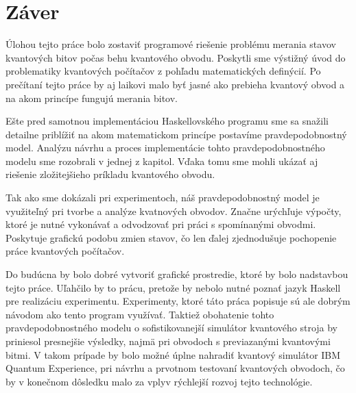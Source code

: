 
\chapter{Záver}
Úlohou tejto práce bolo zostaviť programové riešenie problému merania
stavov kvantových bitov počas behu kvantového obvodu. Poskytli sme výstižný
úvod do problematiky kvantových počítačov z pohľadu matematických 
definýcií. Po prečítaní tejto práce by aj laikovi malo byť jasné ako prebieha
kvantový obvod a na akom princípe fungujú merania bitov.

Ešte pred samotnou implementáciou Haskellovského programu sme sa snažili 
detailne priblížiť na akom matematickom princípe postavíme pravdepodobnostný
model. Analýzu návrhu a proces implementácie tohto pravdepodobnostného modelu
sme rozobrali v jednej z kapitol. Vďaka tomu sme mohli ukázať aj riešenie 
zložitejšieho príkladu kvantového obvodu.

Tak ako sme dokázali pri experimentoch, náš pravdepodobnostný model je 
využiteľný pri tvorbe a analýze kvatnových obvodov. Značne urýchľuje výpočty,
ktoré je nutné vykonávať a odvodzovať pri práci s spomínanými obvodmi.
Poskytuje grafickú podobu zmien stavov, čo len ďalej zjednodušuje pochopenie
práce kvantových počítačov.

Do budúcna by bolo dobré vytvoriť grafické prostredie, ktoré by bolo 
nadstavbou tejto práce. Uľahčilo by to prácu, pretože by nebolo nutné poznať
jazyk Haskell pre realizáciu experimentu. Experimenty, ktoré táto práca 
popisuje sú ale dobrým návodom ako tento program využívať. Taktiež obohatenie 
tohto pravdepodobnostného modelu o sofistikovanejší simulátor kvantového stroja
by priniesol presnejšie výsledky, najmä pri obvodoch s previazanými kvantovými
bitmi. V takom prípade by bolo možné úplne nahradiť kvantový simulátor
IBM Quantum Experience, pri návrhu a prvotnom testovaní kvantových obvodoch,
čo by v konečnom dôsledku malo za vplyv rýchlejší rozvoj tejto technológie.
